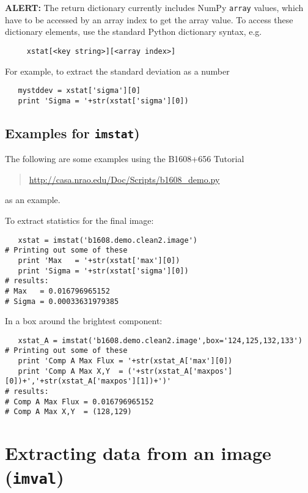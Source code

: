 {\bf ALERT:} The return dictionary currently includes 
NumPy {\tt array} values, which have to be accessed by
an array index to get the array value.
To access these dictionary elements, use the standard Python
dictionary syntax, e.g.
\small
\begin{verbatim}
     xstat[<key string>][<array index>]
\end{verbatim}
\normalsize
For example, to extract the standard deviation as a number
\small
\begin{verbatim}
   mystddev = xstat['sigma'][0]
   print 'Sigma = '+str(xstat['sigma'][0])
\end{verbatim}
\normalsize

\subsection{Examples for {\tt imstat})}
\label{section:analysis.imstat.examples}

The following are some examples using the B1608+656 Tutorial
\begin{quote}
  \url{http://casa.nrao.edu/Doc/Scripts/b1608_demo.py}
\end{quote}
as an example.

To extract statistics for the final image:
\small
\begin{verbatim}
   xstat = imstat('b1608.demo.clean2.image')
# Printing out some of these
   print 'Max   = '+str(xstat['max'][0])
   print 'Sigma = '+str(xstat['sigma'][0])
# results:
# Max   = 0.016796965152
# Sigma = 0.00033631979385
\end{verbatim}
\normalsize

In a box around the brightest component:
\small
\begin{verbatim}
   xstat_A = imstat('b1608.demo.clean2.image',box='124,125,132,133')
# Printing out some of these
   print 'Comp A Max Flux = '+str(xstat_A['max'][0])
   print 'Comp A Max X,Y  = ('+str(xstat_A['maxpos'][0])+','+str(xstat_A['maxpos'][1])+')'
# results:
# Comp A Max Flux = 0.016796965152
# Comp A Max X,Y  = (128,129)
\end{verbatim}
\normalsize

\section{Extracting data from an image ({\tt imval})}
\label{section:analysis.imval}

